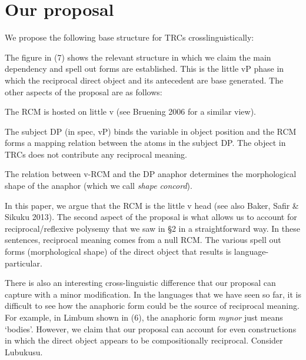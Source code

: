 \chapter{Our proposal }

We propose the following base structure for TRCs crosslinguistically:

 
\setcounter{listWWviiiNumxlileveli}{0}
\begin{listWWviiiNumxlileveli}
\item \end{listWWviiiNumxlileveli}
\setcounter{listWWviiiNumxixleveli}{0}
\begin{listWWviiiNumxixleveli}
\begin{styleExample}
The figure in (7) shows the relevant structure in which we claim the main dependency and spell out forms are established. This is the little vP phase in which the reciprocal direct object and its antecedent are base generated. The other aspects of the proposal are as follows:
\end{styleExample}
\end{listWWviiiNumxixleveli}
\begin{listWWviiiNumxxxviiileveli}
\item The RCM is hosted on little v (see Bruening 2006 for a similar view).

\item The subject DP (in spec, vP) binds the variable in object position and the RCM forms a mapping relation between the atoms in the subject DP.\textbf{ }The object in TRCs does not contribute any reciprocal meaning.

\item The relation between v-RCM and the DP anaphor determines the morphological shape of the anaphor (which we call \textit{shape concord}).

\end{listWWviiiNumxxxviiileveli}

In this paper, we argue that the RCM is the little v head (see also Baker, Safir \& Sikuku 2013). The second aspect of the proposal is what allows us to account for reciprocal/reflexive polysemy that we saw in §2 in a straightforward way. In these sentences, reciprocal meaning comes from a null RCM. The various spell out forms (morphological shape) of the direct object that results is language-particular. 

  There is also an interesting cross-linguistic difference that our proposal can capture with a minor modification. In the languages that we have seen so far, it is difficult to see how the anaphoric form could be the source of reciprocal meaning. For example, in Limbum shown in (6), the anaphoric form \textit{mynor} just means ‘bodies’. However, we claim that our proposal can account for even constructions in which the direct object appears to be compositionally reciprocal. Consider Lubukusu.

